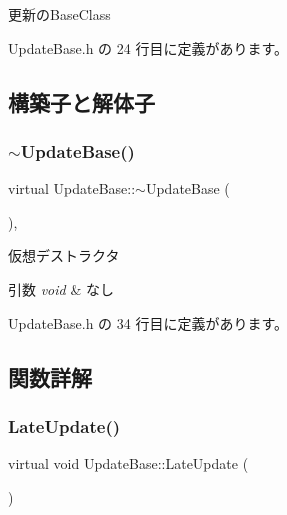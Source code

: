 更新の\+Base\+Class 

 Update\+Base.\+h の 24 行目に定義があります。



\subsection{構築子と解体子}
\mbox{\label{class_update_base_aad4c3e15c4b67871a0fe13c9f85e5918}} 
\subsubsection{\texorpdfstring{$\sim$\+Update\+Base()}{~UpdateBase()}}
{\footnotesize\ttfamily virtual Update\+Base\+::$\sim$\+Update\+Base (\begin{DoxyParamCaption}{ }\end{DoxyParamCaption})\hspace{0.3cm}{\ttfamily [inline]}, {\ttfamily [virtual]}}



仮想デストラクタ 


\begin{DoxyParams}{引数}
{\em void} & なし \\
\hline
\end{DoxyParams}


 Update\+Base.\+h の 34 行目に定義があります。



\subsection{関数詳解}
\mbox{\label{class_update_base_afc4956f78135aed5fc4e4f9991be50b9}} 
\subsubsection{\texorpdfstring{Late\+Update()}{LateUpdate()}}
{\footnotesize\ttfamily virtual void Update\+Base\+::\+Late\+Update (\begin{DoxyParamCaption}{ }\end{DoxyParamCaption})\hspace{0.3cm}{\ttfamily [pure virtual]}}



